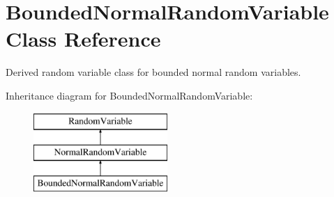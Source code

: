 \section{Bounded\+Normal\+Random\+Variable Class Reference}
\label{classPecos_1_1BoundedNormalRandomVariable}


Derived random variable class for bounded normal random variables.  


Inheritance diagram for Bounded\+Normal\+Random\+Variable\+:\begin{figure}[H]
\begin{center}
\leavevmode
\includegraphics[height=3.000000cm]{classPecos_1_1BoundedNormalRandomVariable}
\end{center}
\end{figure}
